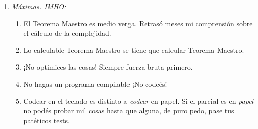 \begin{enumerate}[label=\tiny\purple{\faIcon{snowman}}]
\begin{enumerate}[label=\faIcon{gamepad}$_{\arabic*}$]
          \item Si
                $$
                  \begin{array}{c}
                    f(n) = \Theta(n^{\log_{\blue{b}}(\magenta{a})} (\log(n))^k)
                    \text{ para algún } k \geq 0
                    \entonces
                    \cajaResultado{
                      T(n) =
                      \Theta
                      \big(
                      n^{\log_{\blue{b}}(\magenta{a})} \cdot (\log(n))^{k+1}
                      \big)
                    }
                  \end{array}
                $$

          \item
                Si
                {\small
                $$
                  \begin{array}{c}
                    f(n) = \Omega(n^{\log_{\blue{b}}(\magenta{a}) + \varepsilon})
                    \text{ para algún }
                    \varepsilon > 0 \ytext \magenta{a} f(\frac{n}{\blue{b}}) \leq c f(n)
                    \text{ para algún } c \en (0,1)
                    \entonces
                    \cajaResultado{
                      T(n) = \Theta(f(n))
                    }
                  \end{array}
                $$
                }
        \end{enumerate}

  \item \textit{Máximas. IMHO:}
        \begin{enumerate}[label=\red{\faIcon{atom}}$_{(\arabic*)}$]

          \item El Teorema Maestro es medio verga. Retrasó meses mi comprensión sobre el cálculo de la complejidad.

          \item Lo calculable  Teorema Maestro se tiene que calcular  Teorema Maestro.

          \item ¡No optimices las cosas! Siempre fuerza bruta primero.

          \item No hagas un programa compilable ¡No codeés!

          \item Codear en el teclado es distinto a \textit{codear} en papel. Si el parcial es en \textit{papel}
                no podés probar mil cosas hasta que alguna, de puro pedo, pase tus patéticos tests.


\end{enumerate}
\end{enumerate}
